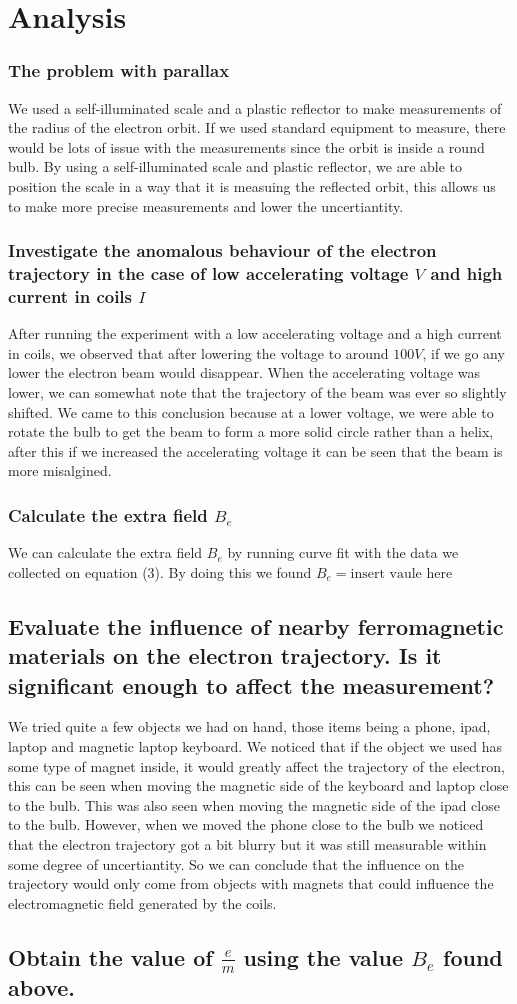 \documentclass{article}
\begin{document}
\section{Analysis}
\subsubsection*{The problem with parallax}
We used a self-illuminated scale and a plastic reflector to make measurements
of the radius of the electron orbit. If we used standard equipment to measure,
there would be lots of issue with the measurements since the orbit is inside a
round bulb. By using a self-illuminated scale and plastic reflector, we are able
to position the scale in a way that it is measuing the reflected orbit, this
allows us to make more precise measurements and lower the uncertiantity.
\subsubsection*{Investigate the anomalous behaviour of the electron trajectory
in the case of low accelerating voltage $V$ and high current in coils $I$}
After running the experiment with a low accelerating voltage and a high current
in coils, we observed that after lowering the voltage to around $100V$, if we go
any lower the electron beam would disappear. When the accelerating voltage was
lower, we can somewhat note that the trajectory of the beam was ever so slightly
shifted. We came to this conclusion because at a lower voltage, we were able to
rotate the bulb to get the beam to form a more solid circle rather than a helix,
after this if we increased the accelerating voltage it can be seen that the
beam is more misalgined.
\subsubsection*{Calculate the extra field $B_e$}
We can calculate the extra field $B_e$ by running curve fit with the data we
collected on equation (3). By doing this we found $B_e = \text{insert vaule here}$

\subsection*{Evaluate the influence of nearby ferromagnetic materials on the
electron trajectory. Is it significant enough to affect the measurement?}
We tried quite a few objects we had on hand, those items being a phone, ipad,
laptop and magnetic laptop keyboard. We noticed that if the object we used has
some type of magnet inside, it would greatly affect the trajectory of the electron,
this can be seen when moving the magnetic side of the keyboard and laptop close
to the bulb. This was also seen when moving the magnetic side of the ipad close
to the bulb. However, when we moved the phone close to the bulb we noticed that
the electron trajectory got a bit blurry but it was still measurable within some
degree of uncertiantity. So we can conclude that the influence on the trajectory
would only come from objects with magnets that could influence the electromagnetic
field generated by the coils.

\subsection*{Obtain the value of $\frac{e}{m}$ using the value $B_e$ found above.}
\end{document}
